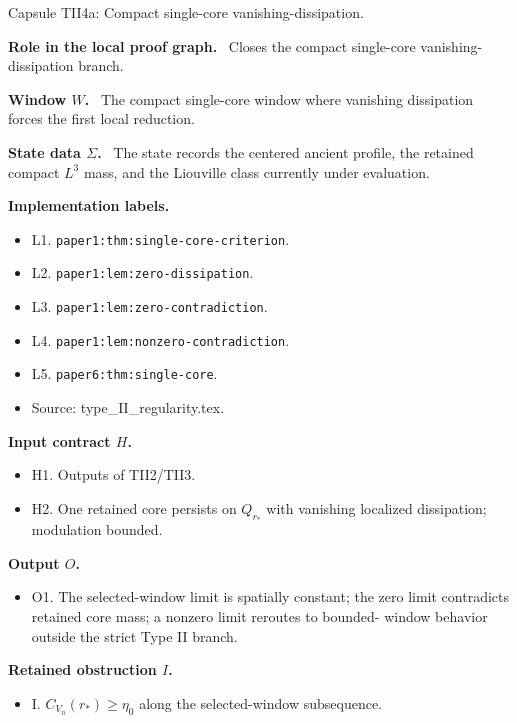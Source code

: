 \documentclass[11pt]{amsart}
\newcommand{\capsulefield}[1]{\par\smallskip\noindent\textbf{#1.}\ }
\begin{document}
\begin{proofcapsule}{Capsule TII4a: Compact single-core vanishing-dissipation.}
  \capsulefield{Role in the local proof graph}
  Closes the compact single-core vanishing-dissipation branch.

  \capsulefield{Window \(W\)}
The compact single-core window where vanishing dissipation forces the first local reduction.

  \capsulefield{State data \(\Sigma\)}
The state records the centered ancient profile, the retained compact $L^3$ mass, and the Liouville class currently under evaluation.

  \capsulefield{Implementation labels}
  \begin{itemize}[leftmargin=1.8em]
  \item L1. \texttt{paper1:thm:single-core-criterion}.
  \item L2. \texttt{paper1:lem:zero-dissipation}.
  \item L3. \texttt{paper1:lem:zero-contradiction}.
  \item L4. \texttt{paper1:lem:nonzero-contradiction}.
  \item L5. \texttt{paper6:thm:single-core}.
  \item Source: type\_II\_regularity.tex.
  \end{itemize}

  \capsulefield{Input contract \(H\)}
  \begin{itemize}[leftmargin=1.8em]
  \item H1. Outputs of TII2/TII3.
  \item H2. One retained core persists on $Q_{r_*}$ with vanishing localized dissipation; modulation bounded.
  \end{itemize}

  \capsulefield{Output \(O\)}
  \begin{itemize}[leftmargin=1.8em]
  \item O1. The selected-window limit is spatially constant; the zero limit contradicts retained core mass; a nonzero limit reroutes to bounded- window behavior outside the strict Type II branch.
  \end{itemize}

  \capsulefield{Retained obstruction \(I\)}
  \begin{itemize}[leftmargin=1.8em]
  \item I. $C_{V_n}(r_*)\ge \eta_0$ along the selected-window subsequence.
  \end{itemize}


\end{proofcapsule}
\end{document}

